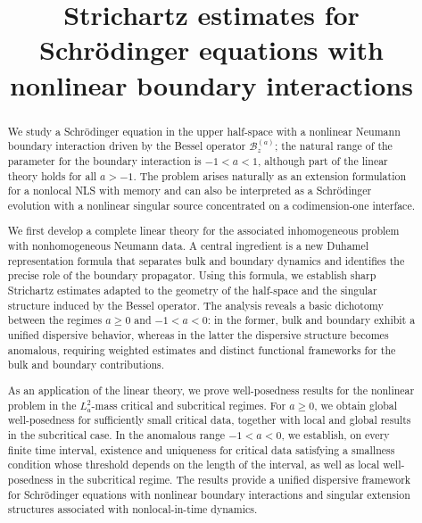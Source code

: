 \documentclass[11pt,letter]{amsart}
\newcommand{\Ba}{\mathscr B_z^{(a)}}
\numberwithin{equation}{section}
\numberwithin{equation}{section}
\begin{document}

	
	
\title[]{Strichartz estimates for Schr\"odinger equations with nonlinear boundary interactions} 
	
	
	
	
	
\date{}
	
\begin{abstract}
We study a Schr\"odinger equation in the upper half-space with a nonlinear Neumann boundary interaction driven by the Bessel operator $\Ba$; the natural range of the parameter for the boundary interaction is $-1<a<1$, although part of the linear theory holds for all $a>-1$. The problem arises naturally as an extension formulation for a nonlocal NLS with memory and can also be interpreted as a Schr\"odinger evolution with a nonlinear singular source concentrated on a codimension-one interface.

We first develop a complete linear theory for the associated inhomogeneous problem with nonhomogeneous Neumann data. A central ingredient is a new Duhamel representation formula that separates bulk and boundary dynamics and identifies the precise role of the boundary propagator. Using this formula, we establish sharp Strichartz estimates adapted to the geometry of the half-space and the singular structure induced by the Bessel operator. The analysis reveals a basic dichotomy between the regimes $a\ge 0$ and $-1<a<0$: in the former, bulk and boundary exhibit a unified dispersive behavior, whereas in the latter the dispersive structure becomes anomalous, requiring weighted estimates and distinct functional frameworks for the bulk and boundary contributions.

As an application of the linear theory, we prove well-posedness results for the nonlinear problem in the $L_a^2$-mass critical and subcritical regimes. For $a\ge 0$, we obtain global well-posedness for sufficiently small critical data, together with local and global results in the subcritical case. In the anomalous range $-1<a<0$, we establish, on every finite time interval, existence and uniqueness for critical data satisfying a smallness condition whose threshold depends on the length of the interval, as well as local well-posedness in the subcritical regime. The results provide a unified dispersive framework for Schr\"odinger equations with nonlinear boundary interactions and singular extension structures associated with nonlocal-in-time dynamics.
\end{abstract}
	
\end{document}
